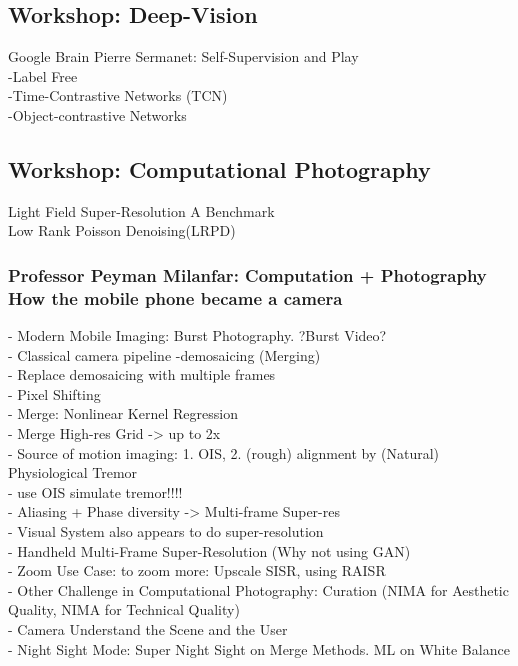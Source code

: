 \subsection{Workshop: Deep-Vision}
Google Brain Pierre Sermanet: Self-Supervision and Play\\
-Label Free\\
-Time-Contrastive Networks (TCN)\\
-Object-contrastive Networks\\

\subsection{Workshop: Computational Photography}
Light Field Super-Resolution A Benchmark\\

Low Rank Poisson Denoising(LRPD)\\

\subsubsection{Professor Peyman Milanfar: Computation + Photography How the mobile phone became a camera}
    - Modern Mobile Imaging: Burst Photography. ?Burst Video?\\
    - Classical camera pipeline -demosaicing (Merging)\\
    - Replace demosaicing with multiple frames\\
    - Pixel Shifting\\
    - Merge: Nonlinear Kernel Regression\\
    - Merge High-res Grid -> up to 2x\\
    - Source of motion imaging: 1. OIS, 2. (rough) alignment by (Natural) Physiological Tremor\\
    - use OIS simulate tremor!!!!\\
    - Aliasing + Phase diversity -> Multi-frame Super-res\\
    - Visual System also appears to do super-resolution\\
    - Handheld Multi-Frame Super-Resolution (Why not using GAN)\\
    - Zoom Use Case: to zoom more: Upscale SISR, using RAISR\\
    - Other Challenge in Computational Photography: Curation (NIMA for Aesthetic Quality, NIMA for Technical Quality)\\
    - Camera Understand the Scene and the User\\
    - Night Sight Mode: Super Night Sight on Merge Methods. ML on White Balance\\

